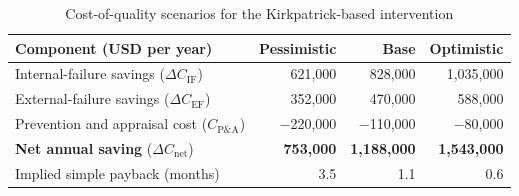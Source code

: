 \begin{table}[H]
  \centering
  \caption{Cost-of-quality scenarios for the Kirkpatrick-based intervention}
  \label{tab:coq-scenarios}
  \small
  \begin{tabular}{@{}p{7.2cm}rrr@{}}
    \toprule
    \textbf{Component (USD per year)} & \textbf{Pessimistic} & \textbf{Base} & \textbf{Optimistic} \\
    \midrule
    Internal-failure savings ($\Delta C_{\text{IF}}$)   & 621,000      & 828,000        & 1,035,000 \\
    External-failure savings ($\Delta C_{\text{EF}}$)   & 352,000      & 470,000        & 588,000 \\
    Prevention and appraisal cost ($C_{\text{P\&A}}$)   & $-$220,000   & $-$110,000     & $-$80,000 \\
    \midrule
    \textbf{Net annual saving} ($\Delta C_{\text{net}}$) & \textbf{753,000} & \textbf{1,188,000} & \textbf{1,543,000} \\
    \midrule
    Implied simple payback (months)                     & 3.5          & 1.1            & 0.6 \\
    \bottomrule
  \end{tabular}
\end{table}
